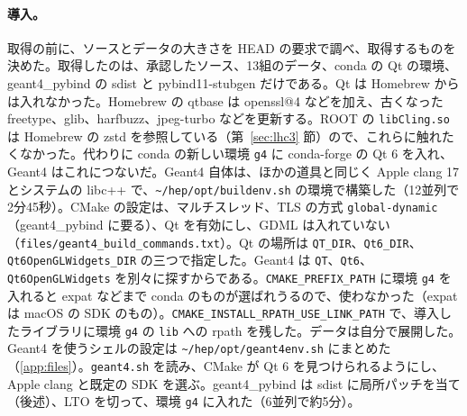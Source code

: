 \documentclass[a4paper,10pt]{ltjsarticle}
\newcommand{\pth}[1]{\texttt{\textasciitilde/}\nolinkurl{#1}}
\begin{document}
\paragraph{導入。}取得の前に、ソースとデータの大きさを HEAD の要求で調べ、取得するものを決めた。取得したのは、承認したソース、13組のデータ、conda の Qt の環境、geant4\_pybind の sdist と pybind11-stubgen だけである。Qt は Homebrew からは入れなかった。Homebrew の qtbase は openssl@4 などを加え、古くなった freetype、glib、harfbuzz、jpeg-turbo などを更新する。ROOT の \texttt{libCling.so} は Homebrew の zstd を参照している（第~\ref{sec:lhc3} 節）ので、これらに触れたくなかった。代わりに conda の新しい環境 \texttt{g4} に conda-forge の Qt 6 を入れ、Geant4 はこれにつないだ。Geant4 自体は、ほかの道具と同じく Apple clang 17 とシステムの libc++ で、\pth{hep/opt/buildenv.sh} の環境で構築した（12並列で2分45秒）。CMake の設定は、マルチスレッド、TLS の方式 \texttt{global-dynamic}（geant4\_pybind に要る）、Qt を有効にし、GDML は入れていない（\nolinkurl{files/geant4_build_commands.txt}）。Qt の場所は \texttt{QT\_DIR}、\texttt{Qt6\_DIR}、\texttt{Qt6OpenGLWidgets\_DIR} の三つで指定した。Geant4 は \texttt{QT}、\texttt{Qt6}、\texttt{Qt6OpenGLWidgets} を別々に探すからである。\texttt{CMAKE\_PREFIX\_PATH} に環境 \texttt{g4} を入れると expat などまで conda のものが選ばれうるので、使わなかった（expat は macOS の SDK のもの）。\texttt{CMAKE\_INSTALL\_RPATH\_USE\_LINK\_PATH} で、導入したライブラリに環境 \texttt{g4} の \texttt{lib} への rpath を残した。データは自分で展開した。Geant4 を使うシェルの設定は \pth{hep/opt/geant4env.sh} にまとめた（\ref{app:files}）。\texttt{geant4.sh} を読み、CMake が Qt 6 を見つけられるようにし、Apple clang と既定の SDK を選ぶ。geant4\_pybind は sdist に局所パッチを当て（後述）、LTO を切って、環境 \texttt{g4} に入れた（6並列で約5分）。
\end{document}
